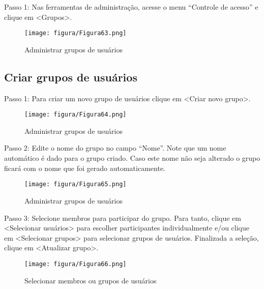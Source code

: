 \documentclass[12pt,hidelinks]{article}
\begin{document}
    \singlespacing
    
    Passo 1: Nas ferramentas de administração, acesse o menu “Controle de acesso” e clique em <Grupos>.
    
    \begin{figure}[!htp]
                \centering
                \texttt{[image: figura/Figura63.png]}
                \caption{Administrar grupos de usuários}
            \label{Rotulo}
        \end{figure}
    
    \subsection{Criar grupos de usuários}
    
    Passo 1: Para criar um novo grupo de usuários clique em <Criar novo grupo>.
    
    \begin{figure}[!htp]
                \centering
                \texttt{[image: figura/Figura64.png]}
                \caption{Administrar grupos de usuários}
            \label{Rotulo}
        \end{figure}
\newpage
    
    Passo 2: Edite o nome do grupo no campo “Nome”. Note que um nome automático é dado para o grupo criado. Caso este nome não seja alterado o grupo ficará com o nome que foi gerado automaticamente.
    
    \begin{figure}[!htp]
                \centering
                \texttt{[image: figura/Figura65.png]}
                \caption{Administrar grupos de usuários}
            \label{Rotulo}
        \end{figure}
    
    Passo 3: Selecione membros para participar do grupo. Para tanto, clique em <Selecionar usuários> para escolher participantes individualmente e/ou clique em <Selecionar grupos> para selecionar grupos de usuários. Finalizada a seleção, clique em <Atualizar grupo>.
    
    \begin{figure}[!htp]
                \centering
                \texttt{[image: figura/Figura66.png]}
                \caption{Selecionar membros ou grupos de usuários}
            \label{Rotulo}
        \end{figure}
        
\newpage
    
\end{document}
